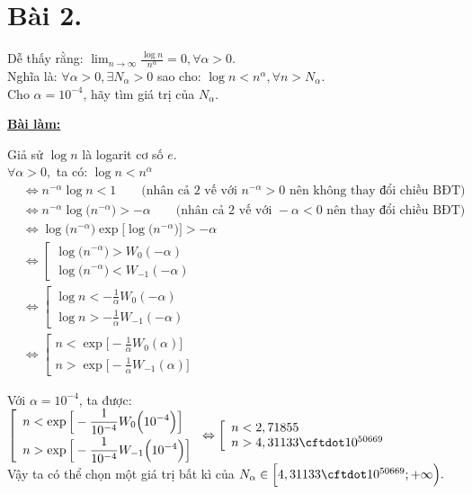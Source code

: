 \section*{Bài 2.}


Dễ thấy rằng: $\displaystyle \lim_{n \to \infty} \frac{\log n}{n^\alpha} = 0, \forall \alpha > 0$.\\
Nghĩa là: $\forall \alpha > 0, \exists N_\alpha > 0$ sao cho: $\log n < n^\alpha, \forall n > N_\alpha$.\\
Cho $\alpha = 10^{-4}$, hãy tìm giá trị của $N_\alpha$.
	

\centering
\textbf{\underline{Bài làm:}}

\justifying
Giả sử $\log n$ là logarit cơ số $e$.\\
$\forall \alpha > 0,$ ta có: $\log n < n^\alpha$
\begin{align*}
&\Leftrightarrow n^{-\alpha} \log n < 1 \qquad \text{(nhân cả 2 vế với } n^{-\alpha} > 0 \text{ nên không thay đổi chiều BĐT)}\\
&\Leftrightarrow n^{-\alpha} \log \big( n^{-\alpha} \big) > -\alpha \qquad \text{(nhân cả 2 vế với } -\alpha < 0 \text{ nên thay đổi chiều BĐT)}\\
&\Leftrightarrow \log \big( n^{-\alpha} \big) \exp \big[ \log \big( n^{-\alpha} \big) \big] > -\alpha\\
&\Leftrightarrow
\left[ \begin{array}{l}
\log \big( n^{-\alpha} \big) > W_{0}(-\alpha)\\
\log \big( n^{-\alpha} \big) < W_{-1}(-\alpha)
\end{array} \right.\\
&\Leftrightarrow
\left[ \begin{array}{l}
\log n < \displaystyle - \frac{1}{\alpha} W_{0}(-\alpha)\\[6pt]
\log n > \displaystyle - \frac{1}{\alpha} W_{-1}(-\alpha)
\end{array} \right.\\
&\Leftrightarrow 
\left[ \begin{array}{l}
n < \exp \Big[ \displaystyle - \frac{1}{\alpha} W_{0}(\alpha) \Big] \\[6pt]
n > \exp \Big[ \displaystyle - \frac{1}{\alpha} W_{-1}(\alpha) \Big]
\end{array} \right.
\end{align*}

Với $\alpha = 10^{-4}$, ta được:\\[6pt]
$\left[ \begin{array}{l}
n < \exp \Big[ \displaystyle - \frac{1}{10^{-4}} W_{0}\Big(10^{-4}\Big) \Big] \\[6pt]
n > \exp \Big[ \displaystyle - \frac{1}{10^{-4}} W_{-1}\Big(10^{-4}\Big) \Big]
\end{array} \right.
\Leftrightarrow
\left[ \begin{array}{l}
n < 2,71855 \\
n > 4,31133 \cftdot 10^{50669}
\end{array} \right.$\\[6pt]
Vậy ta có thể chọn một giá trị bất kì của $N_\alpha \in\Big[4,31133 \cftdot 10^{50669}; +\infty\Big).$

\clearpage